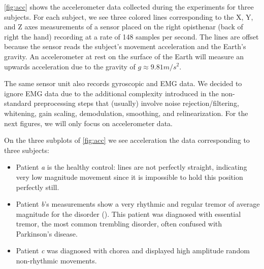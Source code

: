 \cref{fig:acc} shows the accelerometer data collected during the experiments for three subjects. For each subject, we see three colored lines corresponding to the X, Y, and Z axes measurements of a sensor placed on the right opisthenar (back of right the hand) recording at a rate of 148 samples per second. The lines are offset because the sensor reads the subject's movement acceleration and the Earth's gravity. An accelerometer at rest on the surface of the Earth will measure an upwards acceleration due to the gravity of $g \approx 9.81 m/s^2$. 

The same sensor unit also records gyroscopic and EMG data. We decided to ignore EMG data due to the additional complexity introduced in the non-standard preprocessing steps that (usually) involve noise rejection/filtering, whitening, gain scaling, demodulation, smoothing, and relinearization. For the next figures, we will only focus on accelerometer data.


On the three subplots of \cref{fig:acc} we see acceleration the data corresponding to three subjects: 
\begin{itemize}
  \item Patient \textit{a} is the healthy control: lines are not perfectly straight, indicating very low magnitude movement since it is impossible to hold this position perfectly still.
  \item Patient \textit{b}'s measurements show a very rhythmic and regular tremor of average magnitude for the disorder (). This patient was diagnosed with essential tremor, the most common trembling disorder, often confused with Parkinson's disease.
  \item Patient \textit{c} was diagnosed with chorea and displayed high amplitude random non-rhythmic movements. 
\end{itemize}
 


